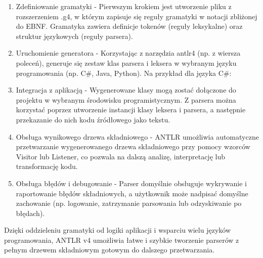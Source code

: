 \documentclass[12pt,twoside]{article}
\begin{document}
\begin{enumerate}[label=\arabic*., leftmargin=1.25cm]
\item 
Zdefiniowanie gramatyki - Pierwszym krokiem jest utworzenie pliku z rozszerzeniem .g4, w którym zapisuje się reguły gramatyki w notacji zbliżonej do EBNF. Gramatyka zawiera definicje tokenów (reguły leksykalne) oraz struktur językowych (reguły parsera).
\item Uruchomienie generatora - Korzystając z narzędzia antlr4 (np. z wiersza poleceń), generuje się zestaw klas parsera i leksera w wybranym języku programowania (np. C\#, Java, Python). Na przykład dla języka C\#: 
\item Integracja z aplikacją - Wygenerowane klasy mogą zostać dołączone do projektu w wybranym środowisku programistycznym. Z parsera można korzystać poprzez utworzenie instancji klasy leksera i parsera, a następnie przekazanie do nich kodu źródłowego jako tekstu.
\item Obsługa wynikowego drzewa składniowego - ANTLR umożliwia automatyczne przetwarzanie wygenerowanego drzewa składniowego przy pomocy wzorców Visitor lub Listener, co pozwala na dalszą analizę, interpretację lub transformację kodu.

\item Obsługa błędów i debugowanie - Parser domyślnie obsługuje wykrywanie i raportowanie błędów składniowych, a użytkownik może nadpisać domyślne zachowanie (np. logowanie, zatrzymanie parsowania lub odzyskiwanie po błędach).
\end{enumerate}

Dzięki oddzieleniu gramatyki od logiki aplikacji i wsparciu wielu języków programowania, ANTLR v4 umożliwia łatwe i szybkie tworzenie parserów z pełnym drzewem składniowym gotowym do dalszego przetwarzania.
\end{document}
